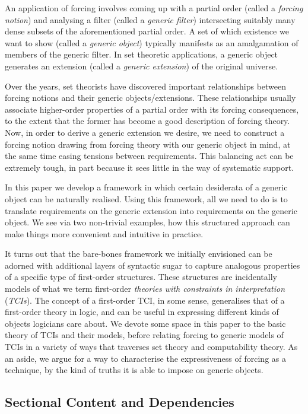 \documentclass[12pt]{article}
\numberwithin{equation}{section}
\begin{document}
An application of forcing involves coming up with a partial order (called a \emph{forcing notion}) and analysing a filter (called a \emph{generic filter}) intersecting suitably many dense subsets of the aforementioned partial order. A set of which existence we want to show (called a \emph{generic object}) typically manifests as an amalgamation of members of the generic filter. In set theoretic applications, a generic object generates an extension (called a \emph{generic extension}) of the original universe. 

Over the years, set theorists have discovered important relationships between forcing notions and their generic objects\slash extensions. These relationships usually associate higher-order properties of a partial order with its forcing consequences, to the extent that the former has become a good description of forcing theory. Now, in order to derive a generic extension we desire, we need to construct a forcing notion drawing from forcing theory with our generic object in mind, at the same time easing tensions between requirements. This balancing act can be extremely tough, in part because it sees little in the way of systematic support.

In this paper we develop a framework in which certain desiderata of a generic object can be naturally realised. Using this framework, all we need to do is to translate requirements on the generic extension into requirements on the generic object. We see via two non-trivial examples, how this structured approach can make things more convenient and intuitive in practice.

It turns out that the bare-bones framework we initially envisioned can be adorned with additional layers of syntactic sugar to capture analogous properties of a specific type of first-order structures. These structures are incidentally models of what we term first-order \emph{theories with constraints in interpretation} (\emph{TCIs}). The concept of a first-order TCI, in some sense, generalises that of a first-order theory in logic, and can be useful in expressing different kinds of objects logicians care about. We devote some space in this paper to the basic theory of TCIs and their models, before relating forcing to generic models of TCIs in a variety of ways that traverses set theory and computability theory. As an aside, we argue for a way to characterise the expressiveness of forcing as a technique, by the kind of truths it is able to impose on generic objects.

\subsection{Sectional Content and Dependencies}
\end{document}
